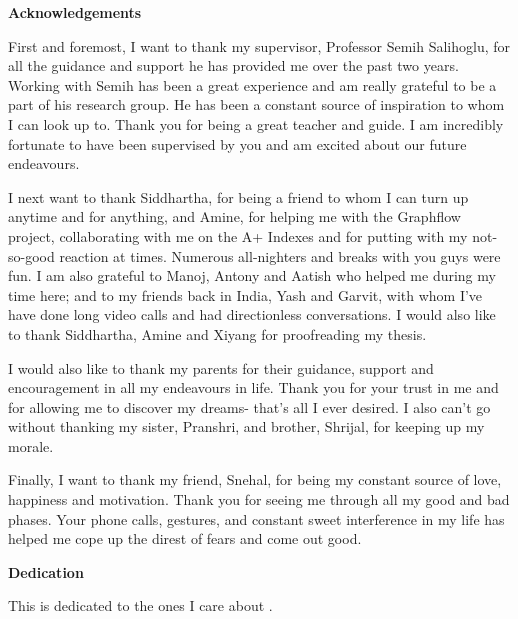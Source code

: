 \begin{center}\textbf{Acknowledgements}\end{center}

First and foremost, I want to thank my supervisor, Professor Semih Salihoglu, for all the guidance and support he has provided me over the past two years. Working with Semih has been a great experience and am really grateful to be a part of his research group. He has been a constant source of inspiration to whom I can look up to. Thank you for being a great teacher and guide.  I am incredibly fortunate to have been supervised by you and am excited about our future endeavours. 

I next want to thank Siddhartha, for being a friend to whom I can turn up anytime and for anything, and Amine, for helping me with the Graphflow project, collaborating with me on the A+ Indexes and for putting with my not-so-good reaction at times. Numerous all-nighters and breaks with you guys were fun. I am also grateful to Manoj, Antony and Aatish who helped me during my time here; and to my friends back in India, Yash and Garvit, with whom I've have done long video calls and had directionless conversations. I would also like to thank Siddhartha, Amine and Xiyang for proofreading my thesis.

I would also like to thank my parents for their guidance, support and encouragement in all my endeavours in life. Thank you for your trust in me and for allowing me to discover my dreams- that's all I ever desired. I also can't go without thanking my sister, Pranshri, and brother, Shrijal, for keeping up my morale. 

Finally, I want to thank my friend, Snehal, for being my constant source of love, happiness and motivation. Thank you for seeing me through all my good and bad phases. Your phone calls, gestures, and constant sweet interference in my life has helped me cope up the direst of fears and come out good.

\cleardoublepage


\begin{center}\textbf{Dedication}\end{center}

This is dedicated to the ones I care about .
\cleardoublepage

\renewcommand\contentsname{Table of Contents}
\tableofcontents
\cleardoublepage
{}    %

